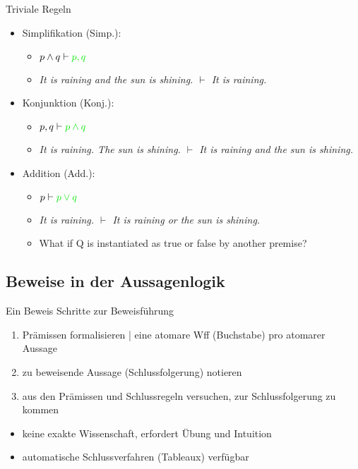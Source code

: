 \begin{frame}
  {Triviale Regeln}
  \begin{itemize}[<+->]
    \item \alert{Simplifikation (Simp.)}:
      \begin{itemize}
        \item \alert{$p\wedge q\vdash\gruen{p, q}$}
        \item \emph{It is raining and the sun is shining. $\vdash$ It is raining.}
      \end{itemize}
      \Halbzeile
    \item \alert{Konjunktion (Konj.)}:
      \begin{itemize}
        \item \alert{$p, q\vdash\gruen{p\wedge q}$}
        \item \emph{It is raining. The sun is shining. $\vdash$ It is raining and the sun is shining.}
      \end{itemize}
      \Halbzeile
    \item \alert{Addition (Add.)}:
      \begin{itemize}
        \item \alert{$p\vdash\gruen{p\vee q}$}
        \item \emph{It is raining. $\vdash$ It is raining or the sun is shining.}
        \item What if Q is instantiated as true or false by another premise?
      \end{itemize}
  \end{itemize}
\end{frame}

\subsection{Beweise in der Aussagenlogik}

\begin{frame}
  {Ein Beweis}
  \onslide<+->
  \onslide<+->
  Schritte zur Beweisführung\\
  \Halbzeile
  \begin{enumerate}[<+->]
    \item Prämissen formalisieren | eine atomare Wff (Buchstabe) pro atomarer Aussage
    \item zu beweisende Aussage (Schlussfolgerung) notieren
    \item aus den Prämissen und Schlussregeln versuchen, zur Schlussfolgerung zu kommen
  \end{enumerate}
  \Halbzeile
  \begin{itemize}[<+->]
    \item keine exakte Wissenschaft, erfordert Übung und Intuition
    \item automatische Schlussverfahren (Tableaux) verfügbar \citep{ParteeEa1990}
  \end{itemize}
\end{frame}

